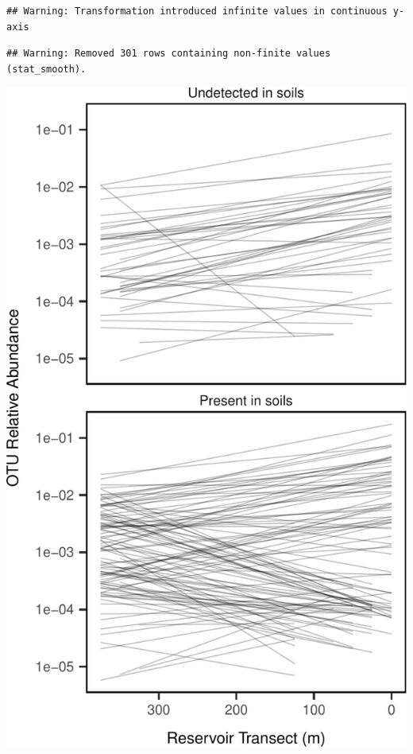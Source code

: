 \documentclass[]{article}
\begin{document}
\begin{verbatim}
## Warning: Transformation introduced infinite values in continuous y-axis
\end{verbatim}

\begin{verbatim}
## Warning: Removed 301 rows containing non-finite values (stat_smooth).
\end{verbatim}

\begin{center}\includegraphics{ReservoirGradient_files/figure-latex/coreplot-1} \end{center}
\end{document}

